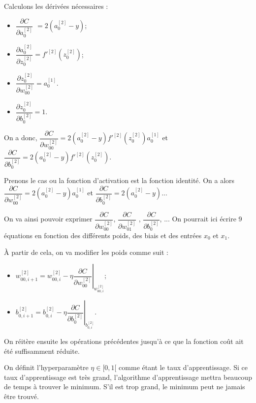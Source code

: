 Calculons les dérivées nécessaires : 
\begin{multicols}{4}
\begin{itemize}
\item $\dfrac{\partial C}{\partial a^{[2]}_{0}}$ $= 2\left( a^{[2]}_{0} - y  \right)$;
\item $ \dfrac{\partial  a^{[2]}_{0}}{\partial z^{[2]}_{0}} = f'^{[2]}\left(z_0^{[2]}\right)$;
\item $\dfrac{\partial z^{[2]}_{0}}{\partial w^{[2]}_{00}}  = a_0^{[1]} $.
\item $\dfrac{\partial z^{[2]}_{0}}{\partial b^{[2]}_{0}} = 1$.
\end{itemize}
\end{multicols}

On a donc, 
$\dfrac{\partial C}{\partial w^{[2]}_{00}} = 2\left( a^{[2]}_{0} - y  \right)  f'^{[2]}\left(z_0^{[2]}\right) a_0^{[1]}$
et 
$\dfrac{\partial C}{\partial b^{[2]}_{0}} = 2\left( a^{[2]}_{0} - y  \right)  f'^{[2]}\left(z_0^{[2]}\right) $.

Prenons le cas ou la fonction d'activation est la fonction identité. 
On a alors
$\dfrac{\partial C}{\partial w^{[2]}_{00}} = 2\left( a^{[2]}_{0} - y  \right)   a_0^{[1]}$
et 
$\dfrac{\partial C}{\partial b^{[2]}_{0}} = 2\left( a^{[2]}_{0} - y  \right)   $...

On va ainsi pouvoir exprimer $\dfrac{\partial C}{\partial w^{[2]}_{00}}$, $\dfrac{\partial C}{\partial w^{[2]}_{01}}$ , $\dfrac{\partial C}{\partial b^{[2]}_{0}}$, ... 
On pourrait ici écrire 9 équations en fonction des différents poids, des biais et des entrées $x_0$ et $x_1$.  

\`A partir de cela, on va modifier les poids comme suit : 
\begin{itemize}
\item $ w^{[2]}_{00,i+1}=w^{[2]}_{00,i}-\eta  \left.\dfrac{\partial C}{\partial w^{[2]}_{00}}\right|_{w^{[2]}_{00,i}}$;
\item $ b^{[2]}_{0,i+1}=b^{[2]}_{0,i}-\eta \left. \dfrac{\partial C}{\partial b^{[2]}_{0}}\right|_{b^{[2]}_{0,i}}$.
\end{itemize}

On réitère ensuite les opérations précédentes jusqu'à ce que la fonction coût ait été suffisamment réduite.

\begin{defi}
On définit l'hyperparamètre $\eta\in[0,1[$ comme étant le taux d'apprentissage. Si ce taux d'apprentissage est très grand, l'algorithme d'apprentissage mettra beaucoup de temps à trouver le minimum. S'il est trop grand, le minimum peut ne jamais être trouvé. 

\end{defi}


